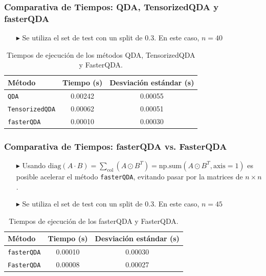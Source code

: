 \documentclass{beamer}
\begin{document}
\begin{frame}
  \frametitle{Comparativa de Tiempos: QDA, TensorizedQDA y fasterQDA}

  \begin{itemize}
    \item[$\blacktriangleright$] Se utiliza el set de test con un split de 0.3. En este caso, $n=40$
  \end{itemize}

  \begin{table}[h!]
      \centering
      \begin{tabular}{@{}lcc@{}}
        \toprule
        \textbf{Método}      & Tiempo (s)           & Desviación estándar (s) \\ 
        \midrule
        \texttt{QDA}         & 0.00242              & 0.00055                 \\ 
        \texttt{TensorizedQDA} & 0.00062            & 0.00051                 \\ 
        \texttt{fasterQDA}   & 0.00010              & 0.00030                 \\ 
        \bottomrule
      \end{tabular}
      \caption{Tiempos de ejecución de los métodos QDA, TensorizedQDA y FasterQDA.}
  \end{table}

\end{frame}


\begin{frame}
  \frametitle{Comparativa de Tiempos: fasterQDA vs. FasterQDA}

  
  \begin{itemize}
    \item[$\blacktriangleright$] Usando \( \text{diag}(A \cdot B) = \sum_{\text{col}}(A \odot B^T) = \text{np.sum}(A \odot B^T, \text{axis}=1) \) es posible acelerar el método \texttt{fasterQDA}, evitando pasar por la matrices de \( n \times n\).
    \item[$\blacktriangleright$] Se utiliza el set de test con un split de 0.3. En este caso, $n=45$
  \end{itemize}

  \begin{table}[h!]
      \centering
      \begin{tabular}{@{}lcc@{}}
        \toprule
        \textbf{Método}      & Tiempo (s)           & Desviación estándar (s) \\ 
        \midrule
        \texttt{fasterQDA}   & 0.00010              & 0.00030                 \\ 
        \texttt{FasterQDA}   & 0.00008              & 0.00027                 \\ 
        \bottomrule
      \end{tabular}
      \caption{Tiempos de ejecución de los fasterQDA y FasterQDA.}
  \end{table}

\end{frame}
\end{document}
